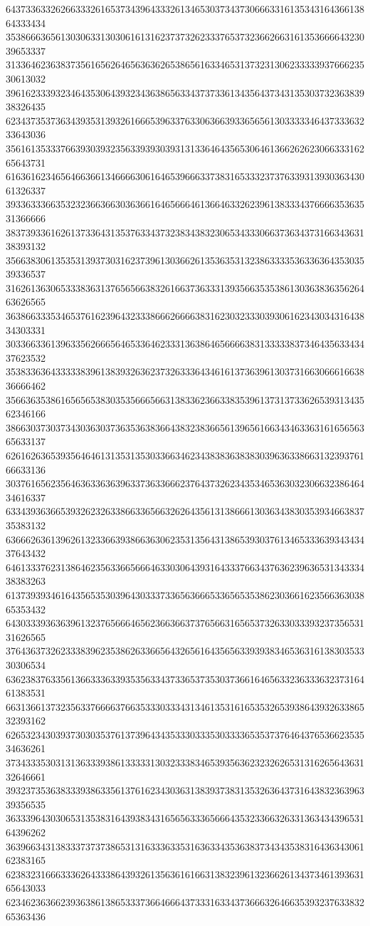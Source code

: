 64373363326266333261653734396433326134653037343730666331613534316436613864333434
35386663656130306331303061613162373732623337653732366266316135366664323039653337
31336462363837356165626465636362653865616334653137323130623333393766623530613032
39616233393234643530643932343638656334373733613435643734313530373236383938326435
62343735373634393531393261666539633763306366393365656130333334643733363233643036
35616135333766393039323563393930393131336464356530646136626262306633316265643731
61636162346564663661346666306164653966633738316533323737633931393036343061326337
39336333663532323663663036366164656664613664633262396138333437666635363531366666
38373933616261373364313537633437323834383230653433306637363437316634363138393132
35663830613535313937303162373961303662613536353132386333353633636435303539336537
31626136306533383631376565663832616637363331393566353538613036383635626463626565
36386633353465376162396432333866626666383162303233303930616234303431643834303331
30336633613963356266656465336462333136386465666638313333383734643563343437623532
35383363643333383961383932636237326333643461613736396130373166306661663836666462
35663635386165656538303535666566313833623663383539613731373362653931343562346166
38663037303734303630373635363836643832383665613965616634346336316165656365633137
62616263653935646461313531353033663462343838363838303963633866313239376166633136
30376165623564636336363963373633666237643732623435346536303230663238646434616337
63343936366539326232633866336566326264356131386661303634383035393466383735383132
63666263613962613233663938663630623531356431386539303761346533363934343437643432
64613337623138646235633665666463303064393164333766343763623963653134333438383263
61373939346164356535303964303337336563666533656535386230366162356636303865353432
64303339363639613237656664656236636637376566316565373263303339323735653131626565
37643637326233383962353862633665643265616435656339393834653631613830353330306534
63623837633561366333633935356334373365373530373661646563323633363237316461383531
66313661373235633766663766353330333431346135316165353265393864393263386532393162
62653234303937303035376137396434353330333530333365353737646437653662353534636261
37343335303131363339386133333130323338346539356362323262653131626564363132646661
39323735363833393863356137616234303631383937383135326364373164383236396339356535
36333964303065313538316439383431656563336566643532336632633136343439653164396262
36396634313833373737386531316333633531636334353638373434353831643634306162383165
62383231666333626433386439326135636161663138323961323662613437346139363165643033
62346236366239363861386533373664666437333163343736663264663539323763383265363436
